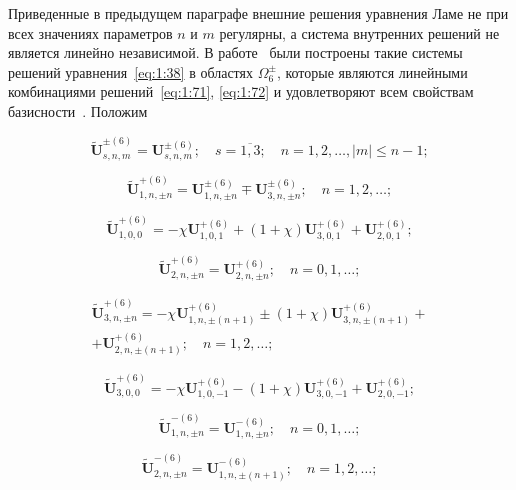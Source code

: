 Приведенные в предыдущем параграфе внешние решения уравнения Ламе не при всех значениях параметров $n$ и $m$ регулярны, а система внутренних решений не является линейно независимой. В работе~\cite{Nikolaev1993} были построены такие системы решений уравнения~\eqref{eq:1:38} в областях $\Omega_6^{\pm}$, которые являются линейными комбинациями решений~\eqref{eq:1:71}, \eqref{eq:1:72} и удовлетворяют всем свойствам базисности~\cite{Nikolaev1998}. Положим

\begin{equation}\label{eq:1:89o}
\mathbf{\tilde U}_{s,n,m}^{\pm(6)}=\mathbf{U}_{s,n,m}^{\pm(6)};\quad s=\overline{1,3};\quad n=1,2,\dots, |m|\le n-1;
\end{equation}

\begin{equation}\label{eq:1:90o}
\mathbf{\tilde U}_{1,n,\pm n}^{+(6)}=\mathbf{U}_{1,n,\pm n}^{\pm(6)}\mp\mathbf{U}_{3,n,\pm n}^{\pm(6)};\quad n=1,2,\dots;
\end{equation}

\begin{equation}\label{eq:1:91o}
\mathbf{\tilde U}_{1,0,0}^{+(6)}=-\chi\mathbf{U}_{1,0,1}^{+(6)}+(1+\chi)\mathbf{U}_{3,0,1}^{+(6)}+
\mathbf{U}_{2,0,1}^{+(6)};
\end{equation}

\begin{equation}\label{eq:1:92o}
\mathbf{\tilde U}_{2,n,\pm n}^{+(6)}=\mathbf{U}_{2,n,\pm n}^{+(6)};\quad n=0,1,\dots;
\end{equation}

\begin{multline}\label{eq:1:93o}
\mathbf{\tilde U}_{3,n,\pm n}^{+(6)}=-\chi\mathbf{U}_{1,n,\pm (n+1)}^{+(6)}\pm(1+\chi)\mathbf{U}_{3,n,\pm (n+1)}^{+(6)}+ \\
+\mathbf{U}_{2,n,\pm (n+1)}^{+(6)};\quad n=1,2,\dots;
\end{multline}

\begin{equation}\label{eq:1:94o}
\mathbf{\tilde U}_{3,0,0}^{+(6)}=-\chi\mathbf{U}_{1,0,-1}^{+(6)}-(1+\chi)\mathbf{U}_{3,0,-1}^{+(6)}+
\mathbf{U}_{2,0,-1}^{+(6)};
\end{equation}

\begin{equation}\label{eq:1:95o}
\mathbf{\tilde U}_{1,n,\pm n}^{-(6)}=\mathbf{U}_{1,n,\pm n}^{-(6)};\quad n=0,1,\dots;
\end{equation}

\begin{equation}\label{eq:1:96o}
\mathbf{\tilde U}_{2,n,\pm n}^{-(6)}=\mathbf{U}_{1,n,\pm (n+1)}^{-(6)};\quad n=1,2,\dots;
\end{equation}

